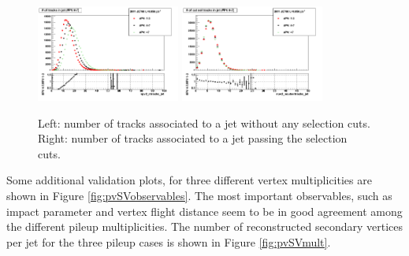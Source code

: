\begin{figure}[h!]
\centering
\includegraphics[width=0.42\textwidth]{figures/npv_ntracks_jet_Linear.png}
\includegraphics[width=0.42\textwidth]{figures/npv_ncutseltracks_jet_Linear.png}
\caption{Left: number of tracks associated to a jet without any selection cuts. Right: number of tracks associated to a jet passing the selection cuts.}
\label{fig:pvNTracks}
\end{figure}

Some additional validation plots, for three different vertex multiplicities are shown in Figure \ref{fig:pvSVobservables}. The most important observables, such as impact parameter and vertex flight distance seem to be in good agreement among the different pileup multiplicities.  The number of reconstructed secondary vertices per jet for the three pileup cases is shown in Figure \ref{fig:pvSVmult}.




